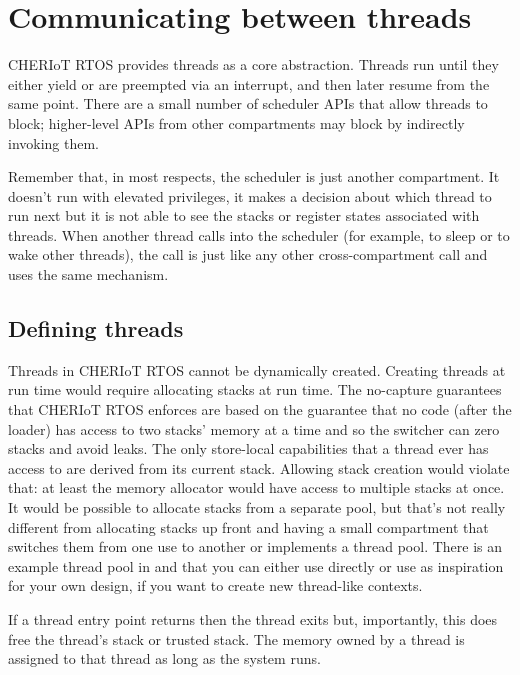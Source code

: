 \chapter[label=threads]{Communicating between threads}

CHERIoT RTOS provides threads as a core abstraction.
Threads run until they either yield or are preempted via an interrupt, and then later resume from the same point.
There are a small number of scheduler APIs that allow threads to block; higher-level APIs from other compartments may block by indirectly invoking them.

Remember that, in most respects, the scheduler is just another compartment.
It doesn't run with elevated privileges, it makes a decision about which thread to run next but it is not able to see the stacks or register states associated with threads.
When another thread calls into the scheduler (for example, to sleep or to wake other threads), the call is just like any other cross-compartment call and uses the same mechanism.

\section{Defining threads}

Threads in CHERIoT RTOS cannot be dynamically created.
Creating threads at run time would require allocating stacks at run time.
The no-capture guarantees that CHERIoT RTOS enforces are based on the guarantee that no code (after the loader) has access to two stacks' memory at a time and so the switcher can zero stacks and avoid leaks.
The only store-local capabilities that a thread ever has access to are derived from its current stack.
Allowing stack creation would violate that: at least the memory allocator would have access to multiple stacks at once.
It would be possible to allocate stacks from a separate pool, but that's not really different from allocating stacks up front and having a small compartment that switches them from one use to another or implements a thread pool.
There is an example thread pool in  and  that you can either use directly or use as inspiration for your own design, if you want to create new thread-like contexts.

If a thread entry point returns then the thread exits but, importantly, this does  free the thread's stack or trusted stack.
The memory owned by a thread is assigned to that thread as long as the system runs.

